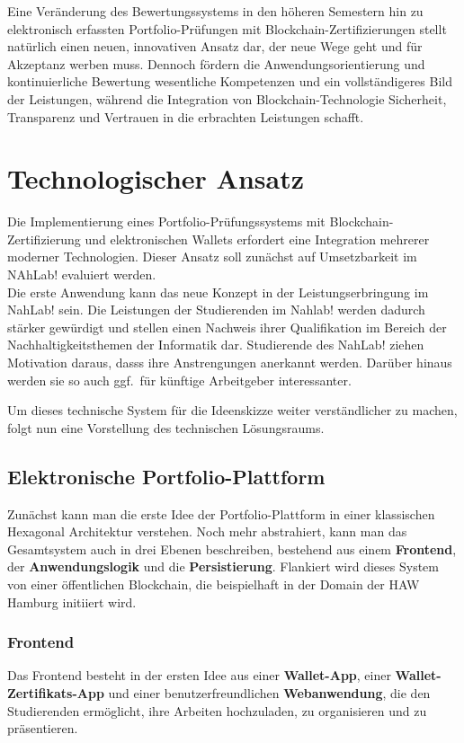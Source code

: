 \documentclass[conference]{IEEEtran}
\begin{document}
Eine Veränderung des Bewertungssystems in den höheren Semestern hin zu elektronisch erfassten Portfolio-Prüfungen mit Blockchain-Zertifizierungen stellt natürlich einen neuen, innovativen Ansatz dar, der neue Wege geht und für Akzeptanz werben muss. Dennoch fördern die Anwendungsorientierung und kontinuierliche Bewertung wesentliche Kompetenzen und ein vollständigeres Bild der Leistungen, während die Integration von Blockchain-Technologie Sicherheit, Transparenz und Vertrauen in die erbrachten Leistungen schafft.

\section{Technologischer Ansatz}
Die Implementierung eines Portfolio-Prüfungssystems mit Blockchain-Zertifizierung und elektronischen Wallets erfordert eine Integration mehrerer moderner Technologien. Dieser Ansatz soll zunächst auf Umsetzbarkeit im NAhLab! evaluiert werden.\\ Die erste Anwendung kann das neue Konzept in der Leistungserbringung im NahLab! sein.
Die Leistungen der Studierenden im Nahlab! werden dadurch stärker gewürdigt und stellen einen Nachweis ihrer Qualifikation im Bereich der Nachhaltigkeitsthemen der Informatik dar. Studierende des NahLab! ziehen Motivation daraus, dasss ihre Anstrengungen anerkannt werden.
Darüber hinaus werden sie so auch ggf.~für künftige Arbeitgeber interessanter.

Um dieses technische System für die Ideenskizze weiter verständlicher zu machen, folgt nun eine Vorstellung des  technischen Lösungsraums.

\subsection{Elektronische Portfolio-Plattform}
Zunächst kann man die erste Idee der Portfolio-Plattform in einer klassischen Hexagonal Architektur \cite{tanenbaum2017distributed} verstehen. Noch mehr abstrahiert, kann man das Gesamtsystem auch in drei Ebenen beschreiben, bestehend aus einem \textbf{Frontend}, der \textbf{Anwendungslogik} und die \textbf{Persistierung}. Flankiert wird dieses System von einer öffentlichen Blockchain, die beispielhaft in der Domain der HAW Hamburg initiiert wird. 

\subsubsection{Frontend}
Das Frontend besteht in der ersten Idee aus einer \textbf{Wallet-App}, einer \textbf{Wallet-Zertifikats-App} und einer benutzerfreundlichen \textbf{Webanwendung}, die den Studierenden ermöglicht, ihre Arbeiten hochzuladen, zu organisieren und zu präsentieren. 
\end{document}
